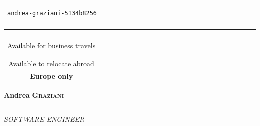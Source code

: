 \documentclass[english,10pt,a4paper]{article}
\begin{document}
\begin{paracol}{2}
\begin{tcolorbox}[colback=CvSidebarBackColor,height=\textheight,boxrule=0pt, left=0pt,right=0pt,top=0pt,bottom=0pt, arc=0pt,outer arc=0pt]
\begin{tabular}{c}
			{\large \textcolor{CvSidebarTextColor}{\textsc{\faLinkedin}}} \\ \href{https://it.linkedin.com/in/andrea-graziani-5134b8256}{\textcolor{CvSidebarTextColor}{\texttt{andrea-graziani-5134b8256}}} \\\\
			
		\end{tabular}
		
		\textcolor{CvSidebarTextColor}{\rule[.5\baselineskip]{0.9\textwidth}{1.5pt}}
		
		\begin{tabular}{c}
			\\
		
			{\large \textcolor{CvSidebarTextColor}{\faPlaneDeparture}} \\ 
			\textcolor{CvSidebarTextColor}{Available for business travels} \\\\
			
			{\large \textcolor{CvSidebarTextColor}{\faGlobeEurope}} \\ 
			\textcolor{CvSidebarTextColor}{Available to relocate abroad} \\
			\textcolor{CvSidebarTextColor}{\textbf{Europe only}}

		\end{tabular}
		
	\end{tcolorbox}
	\switchcolumn  %
	\begin{tcolorbox}[colback=white, height=\textheight,colframe=white, top=0pt,bottom=0pt]
		
		\vspace{1.5cm}
		
		{\Huge \textcolor{CvColor!50}{\textbf{Andrea}} \textcolor{CvColor!80}{\scshape \textbf{Graziani}}} \hfill \\
		\textcolor{CvColor}{\rule[.5\baselineskip]{\textwidth}{2pt}}
		
		
		\hfill {\Large \textcolor{CvColor!60}{\textit{SOFTWARE ENGINEER}}}
		
		\vspace{0.5cm}
		      

\end{tcolorbox}
\end{paracol}
\end{document}
